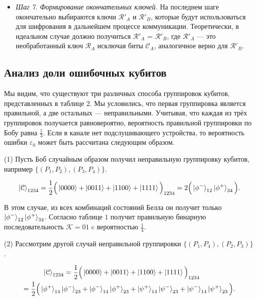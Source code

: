 \documentclass[a4paper,11pt]{article}
\begin{document}
\begin{itemize}
\item \textit{Шаг 7. Формирование окончательных ключей.} На последнем шаге окончательно выбираются ключи $\mathcal{R'}_A$ и $\mathcal{R'}_B$, которые будут использоваться для шифрования в дальнейшем процессе коммуникации. Теоретически, в идеальном случае должно получиться $\mathcal{R'}_A$ = $\mathcal{R'}_B$, где $\mathcal{R'}_A$ --- это необработанный ключ $\mathcal{R}_A$ исключая биты $\mathcal{C}_A$, аналогичное верно для $\mathcal{R'}_B$.
\end{itemize}

\subsection{Анализ доли ошибочных кубитов}

Мы видим, что существуют три различных способа группировок кубитов, представленных в таблице 2. Мы условились, что первая группировка является правильной, а две остальных --- неправильными. Учитывая, что каждая из трёх группировок получается равновероятно, вероятность правильной группировки по Бобу равна $\frac{1}{3}$. Если в канале нет подслушивающего устройства, то вероятность ошибки $\varepsilon_0$ может быть рассчитана следующим образом.

(1) Пусть Боб случайным образом получил неправильную группировку кубитов, например $\{(P_1 , P_2), (P_3 , P_4)\}$.

\begin{equation*}
\ket{\mathcal{C}}_{1234} = \dfrac{1}{2} \Big(\ket{0000} + \ket{0011}
 + \ket{1100} + \ket{1111} \Big)_{1234} = 2 \Big(\ket{\phi^-}_{12} \ket{\phi^+}_{34}\Big).
\end{equation*}

В этом случае, из всех комбинаций состояний Белла он получит только $\ket{\phi^-}_{12} \ket{\phi^+}_{34}$. Согласно таблице $1$ получит правильную бинарную последовательность $\mathcal{K} = 01$ c вероятностью $\frac{1}{4}$.

(2) Рассмотрим другой случай неправильной группировки $\{(P_1, P_4), (P_2, P_3)\}$.

\begin{align*}
\ket{\mathcal{C}}_{1234} = \dfrac{1}{2} \Big(\ket{0000} + \ket{0011}
&+ \ket{1100} + \ket{1111} \Big)_{1234} \nonumber\\
 = \dfrac{1}{2} \Big(
\ket{\phi^+}_{14} \ket{\phi^-}_{23} + \ket{\phi^-}_{14} \ket{\phi^+}_{23} &+ 
\ket{\psi^+}_{14} \ket{\psi^-}_{23} + \ket{\psi^-}_{14} \ket{\psi^+}_{23} \Big).
\end{align*}
\end{document}
